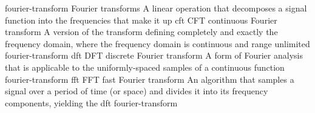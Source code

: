\newglsXterm%
{fourier-transform}%
{Fourier transforms}%
{A linear operation that decomposes a signal function into the frequencies that make it up}%
\newglsXacronym%
{cft}%
{CFT}%
{continuous Fourier transform}%
{A version of the transform defining completely and exactly the frequency domain, where the frequency domain is continuous and range unlimited}%
{fourier-transform}%
\newglsXacronym%
{dft}%
{DFT}%
{discrete Fourier transform}%
{A form of Fourier analysis that is applicable to the uniformly-spaced samples of a continuous function}%
{fourier-transform}%
\newglsXacronym%
{fft}%
{FFT}%
{fast Fourier transform}%
{An algorithm that samples a signal over a period of time (or space) and divides it into its frequency components, yielding the \gls{dft}}%
{fourier-transform}%